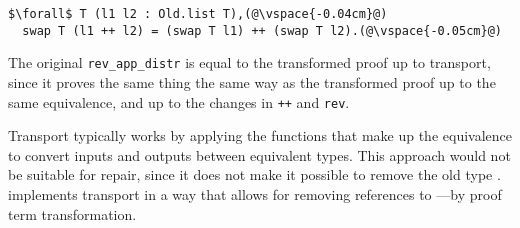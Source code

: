 \begin{lstlisting}
$\forall$ T (l1 l2 : Old.list T),(@\vspace{-0.04cm}@)
  swap T (l1 ++ l2) = (swap T l1) ++ (swap T l2).(@\vspace{-0.05cm}@)
\end{lstlisting}
The original \lstinline{rev_app_distr} is equal to the transformed proof up to transport,
since it proves the same thing the same way as the transformed proof up to the same equivalence, and up to the changes in \lstinline{++}
and \lstinline{rev}.

Transport typically works by applying the functions that make up the equivalence to convert
inputs and outputs between equivalent types.
This approach would not be suitable for repair, since it does not make it possible to remove the old type \A.
\toolname implements transport in a way that allows for removing references to \A---by proof term transformation.







